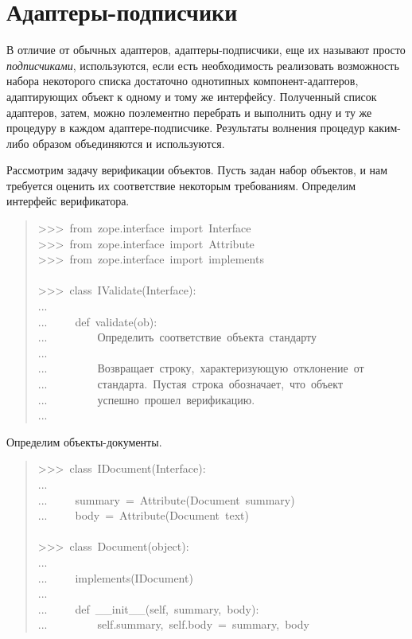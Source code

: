 \documentclass[14pt,a4paper,openany,twoside,final]{extbook}
\providecommand*{\DUroletitlereference}[1]{\textsl{#1}}
\begin{document}
\section{Адаптеры-подписчики%
  \label{id46}%
}

В отличие от обычных адаптеров, адаптеры-подписчики, еще их называют
просто \DUroletitlereference{подписчиками}, используются, если есть необходимость
реализовать возможность набора некоторого списка достаточно однотипных
компонент-адаптеров, адаптирующих объект к одному и тому же
интерфейсу.  Полученный список адаптеров, затем, можно поэлементно
перебрать и выполнить одну и ту же процедуру в каждом
адаптере-подписчике.  Результаты волнения процедур каким-либо образом
объединяются и используются.

Рассмотрим задачу верификации объектов.  Пусть задан набор объектов, и нам
требуется оценить их соответствие некоторым требованиям.  Определим
интерфейс верификатора.

\begin{quote}{\ttfamily \raggedright \noindent
>{}>{}>~from~zope.interface~import~Interface\\
>{}>{}>~from~zope.interface~import~Attribute\\
>{}>{}>~from~zope.interface~import~implements\\
~\\
>{}>{}>~class~IValidate(Interface):\\
...\\
...~~~~~def~validate(ob):\\
...~~~~~~~~~\textquotedbl{}\textquotedbl{}\textquotedbl{}Определить~соответствие~объекта~стандарту\\
...\\
...~~~~~~~~~Возвращает~строку,~характеризующую~отклонение~от\\
...~~~~~~~~~стандарта.~Пустая~строка~обозначает,~что~объект\\
...~~~~~~~~~успешно~прошел~верификацию.\\
...~~~~~~~~~\textquotedbl{}\textquotedbl{}\textquotedbl{}
}
\end{quote}

Определим объекты-документы.

\begin{quote}{\ttfamily \raggedright \noindent
>{}>{}>~class~IDocument(Interface):\\
...\\
...~~~~~summary~=~Attribute(\textquotedbl{}Document~summary\textquotedbl{})\\
...~~~~~body~=~Attribute(\textquotedbl{}Document~text\textquotedbl{})\\
~\\
>{}>{}>~class~Document(object):\\
...\\
...~~~~~implements(IDocument)\\
...\\
...~~~~~def~\_\_init\_\_(self,~summary,~body):\\
...~~~~~~~~~self.summary,~self.body~=~summary,~body
}
\end{quote}
\end{document}
